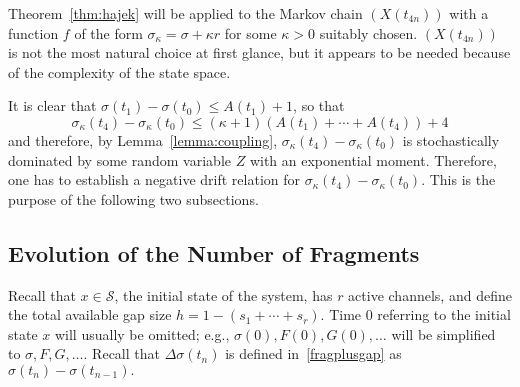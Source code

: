 \documentclass{amsart}
\def\Scal{\mathcal{S}}
\begin{document}
Theorem~\ref{thm:hajek} will be applied to the Markov chain
$(X(t_{4n}))$ with a function $f$ of the form $\sigma_\kappa =
\sigma + \kappa r$ for some $\kappa
> 0$ suitably chosen. $(X(t_{4n}))$ is not the most natural choice
at first glance, but it appears to be needed because of the
complexity of the state space.

It is clear that $\sigma(t_1) - \sigma(t_0) \leq  A(t_1) + 1$, so
that \[ \sigma_\kappa(t_4) - \sigma_\kappa(t_0) \leq (\kappa + 1)
(A(t_1) + \cdots + A(t_4)) + 4
\] and therefore, by Lemma~\ref{lemma:coupling},
$\sigma_\kappa(t_4)-\sigma_\kappa(t_0)$ is stochastically dominated
by some random variable $Z$ with an exponential moment. Therefore,
one has to establish a negative drift relation for
$\sigma_\kappa(t_4) - \sigma_\kappa(t_0)$. This is the purpose of
the following two subsections.
\subsection*{Evolution of the Number of Fragments}
Recall that  $x\in\Scal$, the initial state of
the system, has $r$ active channels, and define the total available gap size
$h  = 1  - (s_1  {+} \cdots  {+} s_r).$  Time $0$ referring to
the initial state $x$  will usually be omitted; e.g., $\sigma(0),
F(0), G(0), \ldots$ will be  simplified to $\sigma, F, G, \ldots$.
Recall  that $\Delta \sigma(t_n) $ is defined in~\eqref{fragplusgap} as $\sigma(t_n) -
\sigma(t_{n-1}).$
\end{document}

